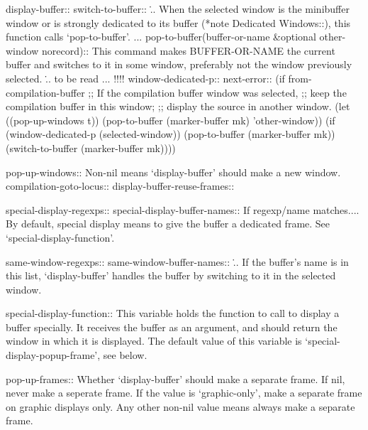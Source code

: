 \documentclass[a4paper]{report}
\begin{document}
display-buffer::
switch-to-buffer::
\... When the selected window is the minibuffer window or is strongly
dedicated to its buffer (*note Dedicated Windows::), this function calls
`pop-to-buffer'. ...
pop-to-buffer(buffer-or-name &optional other-window norecord)::
This command makes BUFFER-OR-NAME the current buffer and switches
to it in some window, preferably not the window previously
selected. 
\... to be read ... !!!!
window-dedicated-p::
next-error::
(if from-compilation-buffer
        ;; If the compilation buffer window was selected,
        ;; keep the compilation buffer in this window;
        ;; display the source in another window.
        (let ((pop-up-windows t))
          (pop-to-buffer (marker-buffer mk) 'other-window))
      (if (window-dedicated-p (selected-window))
          (pop-to-buffer (marker-buffer mk))
        (switch-to-buffer (marker-buffer mk))))




pop-up-windows::
  Non-nil means `display-buffer' should make a new window.
compilation-goto-locus::
display-buffer-reuse-frames::

special-display-regexps::
special-display-buffer-names::
If regexp/name matches.... By default, special display means to give the
buffer a dedicated frame. See `special-display-function'.

same-window-regexps::
same-window-buffer-names::
\... If the buffer's name is in this list, `display-buffer' handles the buffer by
switching to it in the selected window.

special-display-function::
This variable holds the function to call to display a buffer
specially.  It receives the buffer as an argument, and should
return the window in which it is displayed.  The default value of
this variable is `special-display-popup-frame', see below.


pop-up-frames::
Whether `display-buffer' should make a separate frame.
If nil, never make a seperate frame.
If the value is `graphic-only', make a separate frame
on graphic displays only.
Any other non-nil value means always make a separate frame.
  
\end{document}

